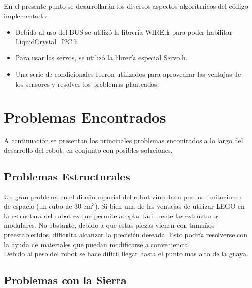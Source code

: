 \documentclass[conference]{IEEEtran}
\begin{document}
En el presente punto se desarrollarán los diversos aspectos algorítmicos del código implementado:\\ 

\begin{itemize}
	
	
	\item Debido al uso del BUS se utilizó la librería WIRE.h para poder habilitar LiquidCrystal{\_}I2C.h\\
	\item Para usar los servos, se utilizó la librería especial Servo.h.\\
	\item Una serie de condicionales fueron utilizados para aprovechar las ventajas de los sensores y resolver los problemas planteados.\\
	
\end{itemize}





\bigskip
\section{Problemas Encontrados}
\bigskip

A continuación se presentan los principales problemas encontrados
a lo largo del desarrollo del robot, en conjunto con posibles
soluciones.

\bigskip
\subsection{Problemas Estructurales}

\bigskip
Un gran problema en el diseño espacial del robot vino dado por
las limitaciones de espacio (un cubo de 30 cm$ ^{3} $). Si bien una de las ventajas de utilizar LEGO\textregistered \vspace{2mm} en la estructura del robot es que permite acoplar fácilmente las estructuras modulares. No obstante, debido a que estas piezas vienen con tamaños preestablecidos, dificulta alcanzar la precisión deseada. Esto podría resolverse con la ayuda de materiales que puedan modificarse a conveniencia.\\

Debido al peso del robot se hace difícil llegar hasta el punto más alto de la guaya.\\


\bigskip
\subsection{Problemas con la Sierra}
\bigskip
\end{document}
